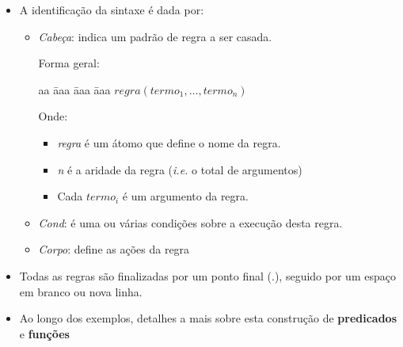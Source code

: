 \begin{frame}[fragile,allowframebreaks=0.8,c]
\begin{itemize}
  \item A identificação da sintaxe é dada por:
  
  \begin{itemize}
  
      \item \emph{Cabeça}: indica um padrão de regra a ser casada.
      
      Forma geral:
      \begin{tabbing}
          aa \= aaa \= aaa \= aaa \kill
          \> \> $regra(termo_1, \ldots,termo_n)$
      \end{tabbing}
      
      Onde:
      
      \begin{itemize}
          \item \emph{regra} é um átomo que define o nome da regra.
          \item \emph{n} é a aridade da regra (\emph{i.e.} o total de argumentos)
          \item Cada \emph{$termo_i$} é um argumento da regra.
      \end{itemize}
      
      \item \emph{Cond}: é uma ou várias condições sobre a execução desta regra.
          
      \item \emph{Corpo}: define as ações da regra 
      
  \end{itemize}
  
  \item Todas as regras são finalizadas por um ponto final (.), seguido por um espaço 
  em branco ou nova linha.
  
  \item Ao longo dos exemplos, detalhes a mais sobre esta construção de \textbf{predicados} e \textbf{funções}
      
\end{itemize}

\end{frame}



